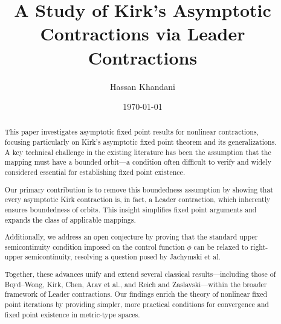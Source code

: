 \documentclass{birkjour}
\theoremstyle{definition}
\theoremstyle{remark}
\numberwithin{equation}{section}
\begin{document}

\title[A study of Kirk's asymptotic contractions]
{A Study of Kirk's Asymptotic Contractions via Leader Contractions}

\author[Hassan Khandani]{Hassan Khandani}
\address{%
Department of Mathematics \\
Mah. C, Islamic Azad University \\
Mahabad, Iran}


\date{\today}

\begin{abstract}
This paper investigates asymptotic fixed point results for nonlinear contractions, focusing particularly on Kirk’s asymptotic fixed point theorem and its generalizations. A key technical challenge in the existing literature has been the assumption that the mapping must have a bounded orbit—a condition often difficult to verify and widely considered essential for establishing fixed point existence.

Our primary contribution is to remove this boundedness assumption by showing that every asymptotic Kirk contraction is, in fact, a Leader contraction, which inherently ensures boundedness of orbits. This insight simplifies fixed point arguments and expands the class of applicable mappings.

Additionally, we address an open conjecture by proving that the standard upper semicontinuity condition imposed on the control function \(\phi\) can be relaxed to right-upper semicontinuity, resolving a question posed by Jachymski et al.

Together, these advances unify and extend several classical results—including those of Boyd–Wong, Kirk, Chen, Arav et al., and Reich and Zaslavski—within the broader framework of Leader contractions. Our findings enrich the theory of nonlinear fixed point iterations by providing simpler, more practical conditions for convergence and fixed point existence in metric-type spaces.
\end{abstract}


\end{document}
